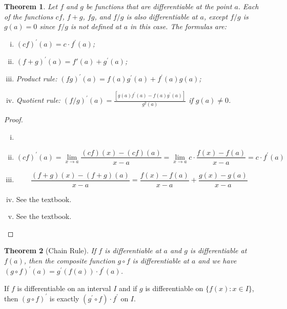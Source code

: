 \documentclass[12pt, lettersize]{book}
\theoremstyle{plain}
\newtheorem{thm}{Theorem}[section]
\theoremstyle{definition}
\theoremstyle{remark}
\begin{document}
			\begin{thm}\label{def:28.3}
			Let $f$ and $g$ be functions that are differentiable at the point $a$. Each of the functions $cf$, $f+g$, $fg$, and $f/g$ is also differentiable at $a$, except $f/g$ is $g(a)=0$ since $f/g$ is not defined at $a$ in this case.
			The formulas are:
			\begin{enumerate}[(i)]
				\item $(cf)^\prime(a)=c\cdot f^\prime(a)$;
				\item $(f+g)^\prime(a)=f\prime(a)+g^\prime(a)$;
				\item Product rule: $(fg)^\prime(a)=f(a)g^\prime(a)+f^\prime(a)g(a)$;
				\item Quotient rule: $(f/g)^\prime(a)=\frac{[g(a)f^\prime(a)-f(a)g^\prime(a)]}{g^2(a)}$ if $g(a)\neq0$.
			\end{enumerate}
			\end{thm}
			\begin{proof}
			\begin{enumerate}[(i)]
				\item[]
				\item
				\begin{displaymath}
					(cf)^\prime(a)=\lim_{x\rightarrow a}\frac{(cf)(x)-(cf)(a)}{x-a}=\lim_{x\rightarrow a}c\cdot\frac{f(x)-f(a)}{x-a}=c\cdot f^\prime(a)
				\end{displaymath} 
				\item
				\begin{displaymath}
					\frac{(f+g)(x)-(f+g)(a)}{x-a}=\frac{f(x)-f(a)}{x-a}+\frac{g(x)-g(a)}{x-a}
				\end{displaymath}
				\item See the textbook.
				\item See the textbook.
			\end{enumerate}
			\end{proof}
			
			\begin{thm}[Chain Rule]\label{def:28.4}
			If $f$ is differentiable at $a$ and $g$ is differentiable at $f(a)$, then the composite function $g\circ f$ is differentiable at $a$ and we have $(g\circ f)^\prime(a)=g^\prime(f(a))\cdot f^\prime(a)$.
			\end{thm}
			If $f$ is differentiable on an interval $I$ and if $g$ is differentiable on $\{f(x): x\in I\}$, then $(g\circ f)^\prime$ is exactly $(g^\prime\circ f)\cdot f^\prime$ on $I$.
			\newpage
			
\end{document}
